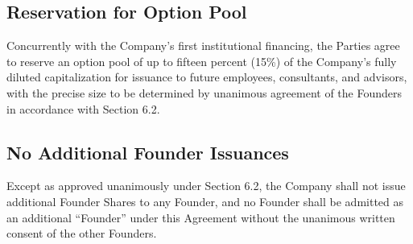 \subsection{Reservation for Option Pool} Concurrently with the Company's first institutional financing, the Parties agree to reserve an option pool of up to fifteen percent (15\%) of the Company's fully diluted capitalization for issuance to future employees, consultants, and advisors, with the precise size to be determined by unanimous agreement of the Founders in accordance with Section 6.2.

\subsection{No Additional Founder Issuances} Except as approved unanimously under Section 6.2, the Company shall not issue additional Founder Shares to any Founder, and no Founder shall be admitted as an additional ``Founder'' under this Agreement without the unanimous written consent of the other Founders.
